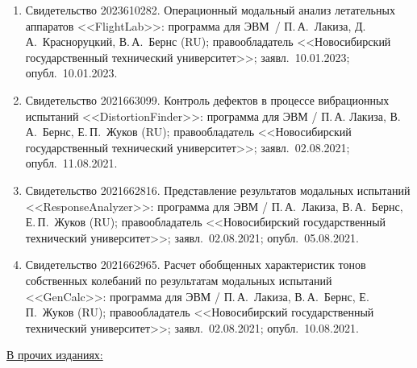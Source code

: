 \begin{enumerate}
	\item Свидетельство 2023610282. Операционный модальный анализ летательных аппаратов <<FlightLab>>: программа для ЭВМ~/ П.\,А.~Лакиза, Д.\,А.~Красноруцкий, В.\,А.~Бернс (RU); правообладатель <<Новосибирский государственный технический университет>>; заявл.~10.01.2023; опубл.~10.01.2023.
	\item Свидетельство 2021663099. Контроль дефектов в процессе вибрационных испытаний <<DistortionFinder>>: программа для ЭВМ / П.\,А. Лакиза, В.\,А.~Бернс, Е.\,П.~Жуков (RU); правообладатель <<Новосибирский государственный технический университет>>; заявл.~02.08.2021; опубл.~11.08.2021.
 	\item Свидетельство 2021662816. Представление результатов модальных испытаний <<ResponseAnalyzer>>: программа для ЭВМ / П.\,А.~Лакиза, В.\,А.~Бернс, Е.\,П.~Жуков (RU); правообладатель <<Новосибирский государственный технический университет>>; заявл.~02.08.2021; опубл.~05.08.2021.
	\item Свидетельство 2021662965. Расчет обобщенных характеристик тонов собственных колебаний по результатам модальных испытаний <<GenCalc>>: программа для ЭВМ / П.\,А.~Лакиза, В.\,А.~Бернс, Е.\,П.~Жуков (RU); правообладатель <<Новосибирский государственный технический университет>>; заявл.~02.08.2021; опубл.~10.08.2021.
\end{enumerate}

\ul{В прочих изданиях:}

